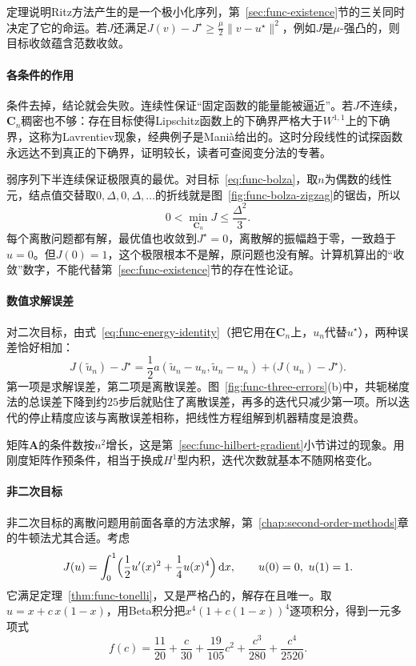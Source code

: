 定理说明Ritz方法产生的是一个极小化序列，第~\ref{sec:func-existence}节的三关同时决定了它的命运。若$J$还满足$J(v)-J^\star\geq\frac\mu2\lVert v-u^\star\rVert^2$，例如$J$是$\mu$-强凸的，则目标收敛蕴含范数收敛。

\paragraph{各条件的作用}
条件去掉，结论就会失败。连续性保证“固定函数的能量能被逼近”。若$J$不连续，$\bm{C}_n$稠密也不够：存在目标使得Lipschitz函数上的下确界严格大于$W^{1,1}$上的下确界，这称为Lavrentiev现象，经典例子是Manià给出的。这时分段线性的试探函数永远达不到真正的下确界，证明较长，读者可查阅变分法的专著。

弱序列下半连续保证极限真的最优。对目标~\eqref{eq:func-bolza}，取$n$为偶数的线性元，结点值交替取$0,\Delta,0,\Delta,\ldots$的折线就是图~\ref{fig:func-bolza-zigzag}的锯齿，所以
\[
 0<\min_{\bm{C}_n}J\leq\frac{\Delta^2}{3}.
\]
每个离散问题都有解，最优值也收敛到$J^\star=0$，离散解的振幅趋于零，一致趋于$u=0$。但$J(0)=1$，这个极限根本不是解，原问题也没有解。计算机算出的“收敛”数字，不能代替第~\ref{sec:func-existence}节的存在性论证。

\paragraph{数值求解误差}
对二次目标，由式~\eqref{eq:func-energy-identity}（把它用在$\bm{C}_n$上，$u_n$代替$u^\star$），两种误差恰好相加：
\begin{equation}
 J(\tilde{u}_n)-J^\star=\frac12a(\tilde{u}_n-u_n,\tilde{u}_n-u_n)+\bigl(J(u_n)-J^\star\bigr).
 \label{eq:func-error-split}
\end{equation}
第一项是求解误差，第二项是离散误差。图~\ref{fig:func-three-errors}(b)中，共轭梯度法的总误差下降到约$25$步后就贴住了离散误差，再多的迭代只减少第一项。所以迭代的停止精度应该与离散误差相称，把线性方程组解到机器精度是浪费。

矩阵$\bm{A}$的条件数按$n^2$增长，这是第~\ref{sec:func-hilbert-gradient}小节讲过的现象。用刚度矩阵作预条件，相当于换成$H^1$型内积，迭代次数就基本不随网格变化。

\paragraph{非二次目标}
非二次目标的离散问题用前面各章的方法求解，第~\ref{chap:second-order-methods}章的牛顿法尤其合适。考虑
\[
 J(u)=\int_0^1\Bigl(\frac12u'(x)^2+\frac14u(x)^4\Bigr)\,\mathrm{d}x,\qquad u(0)=0,\ u(1)=1.
\]
它满足定理~\ref{thm:func-tonelli}，又是严格凸的，解存在且唯一。取$u=x+c\,x(1-x)$，用Beta积分把$x^4(1+c(1-x))^4$逐项积分，得到一元多项式
\[
 f(c)=\frac{11}{20}+\frac{c}{30}+\frac{19}{105}c^2+\frac{c^3}{280}+\frac{c^4}{2520}.
\]

